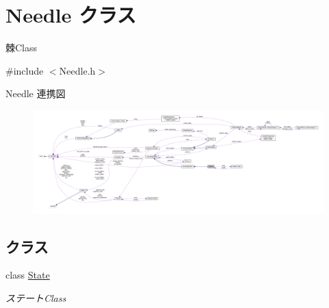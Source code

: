 \hypertarget{class_needle}{}\section{Needle クラス}
\label{class_needle}


棘\+Class  




{\ttfamily \#include $<$Needle.\+h$>$}



Needle 連携図\nopagebreak
\begin{figure}[H]
\begin{center}
\leavevmode
\includegraphics[width=350pt]{class_needle__coll__graph}
\end{center}
\end{figure}
\subsection*{クラス}
\begin{DoxyCompactItemize}
\item 
class \mbox{\hyperlink{class_needle_1_1_state}{State}}
\begin{DoxyCompactList}\small\item\em ステート\+Class \end{DoxyCompactList}\end{DoxyCompactItemize}

